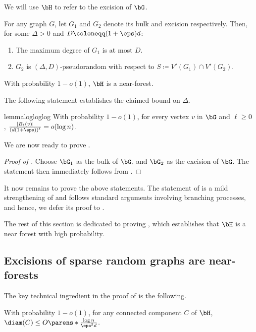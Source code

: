 \documentclass[11pt,letterpaper]{article}
\begin{document}
\begin{notation*}[$\bH$]
    We will use $\bH$ to refer to the excision of $\bG$.
\end{notation*}


\begin{observation} \label{obs:excision-bound-pseudorandom}
    For any graph $G$, let $G_1$ and $G_2$ denote its bulk and excision respectively.
    Then, for some $\Delta > 0$ and $D \coloneqq (1+\eps)d$:
    \begin{enumerate}
        \item The maximum degree of $G_1$ is at most $D$.
        \item $G_2$ is $(\Delta,D)$-pseudorandom with respect to $S\coloneqq V'(G_1)\cap V'(G_2)$.
    \end{enumerate}
\end{observation}

\begin{lemma}   \label{lem:components-tree-excess-1}
    With probability $1-o(1)$, $\bH$ is a near-forest.
\end{lemma}
The following statement establishes the claimed bound on $\Delta$.
\begin{restatable}{lemma}{logloglog}    \label{lem:log-star-bound}
    With probability $1-o(1)$, for every vertex $v$ in $\bG$ and $\ell \ge 0$, $\frac{|B_\ell(v)|}{(d(1+\eps))^{\ell}} = o(\log n)$.
\end{restatable}

We are now ready to prove .
\begin{proof}[Proof of ]
    Choose $\bG_1$ as the bulk of $\bG$, and $\bG_2$ as the excision of $\bG$. 
    The statement then immediately follows from .
\end{proof}


It now remains to prove the above statements.
The statement of  is a mild strengthening of \cite[Lemma 9 of arXiv version]{BGGS24} and follows standard arguments involving branching processes, and hence, we defer its proof to .

The rest of this section is dedicated to proving , which establishes that $\bH$ is a near forest with high probability.

\subsection{Excisions of sparse random graphs are near-forests}
The key technical ingredient in the proof of  is the following.
\begin{lemma}
    \label{lem:components-diam}
    With probability $1-o(1)$, for any connected component $C$ of $\bH$, $\diam(C) \le O\parens*{\tfrac{\log n}{\eps^3 d}}$.
\end{lemma}
\end{document}
